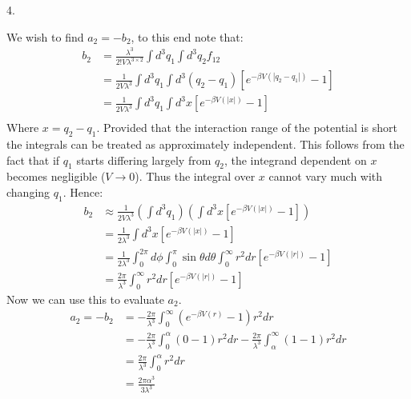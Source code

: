 \documentclass[a4paper,12pt]{article}
\begin{document}
4.
\begin{minipage}[t]{0.9\textwidth}
  We wish to find $a_2 = -b_2$, to this end note that:
  \begin{align*}
    b_2 &= \frac{\lambda^3}{2!V\lambda^{3 \times 2}} \int d^3q_1\int d^3q_2f_{12}\\
        &= \frac{1}{2V\lambda^{3}} \int d^3q_1 \int d^3(q_2 - q_1)\left[e^{-\beta V(|q_2 - q_1|)} - 1\right]\\
        &= \frac{1}{2V\lambda^{3}} \int d^3q_1 \int d^3x \left[e^{-\beta V(|x|)} - 1\right]\\
  \end{align*}
  Where $x = q_2 - q_1$.
  Provided that the interaction range of the potential is short the integrals can be treated as approximately independent.
  This follows from the fact that if $q_1$ starts differing largely from $q_2$, the integrand dependent on $x$ becomes negligible ($V \to 0$). Thus the integral over $x$ cannot vary much with changing $q_1$. Hence:
  \begin{align*}
    b_2 &\approx \frac{1}{2V\lambda^{3}} \left(\int d^3q_1\right)\left( \int d^3x \left[e^{-\beta V(|x|)} - 1\right]\right)\\
        &= \frac{1}{2\lambda^{3}} \int d^3x \left[e^{-\beta V(|x|)} - 1\right]\\
        &= \frac{1}{2\lambda^{3}} \int_0^{2\pi} d \phi \int_0^\pi \sin \theta d\theta\int_0^\infty r^2dr \left[e^{-\beta V(|r|)} - 1\right]\\
        &= \frac{2\pi}{\lambda^{3}} \int_0^\infty r^2dr \left[e^{-\beta V(|r|)} - 1\right]
  \end{align*}
  Now we can use this to evaluate $a_2$. 
  \begin{align*}
    a_2  = -b_2 
        &= -\frac{2 \pi}{\lambda^3} \int_0^\infty(e^{-\beta V(r)} - 1)r^2dr\\
        &= -\frac{2 \pi}{\lambda^3} \int_0^\alpha(0 - 1)r^2dr -\frac{2 \pi}{\lambda^3}\int_\alpha^\infty(1 - 1)r^2dr\\
        &= \frac{2 \pi}{\lambda^3} \int_0^\alpha r^2dr\\
        &= \frac{2 \pi \alpha^3}{3\lambda^3}\\
  \end{align*}
\end{minipage}
\end{document}

